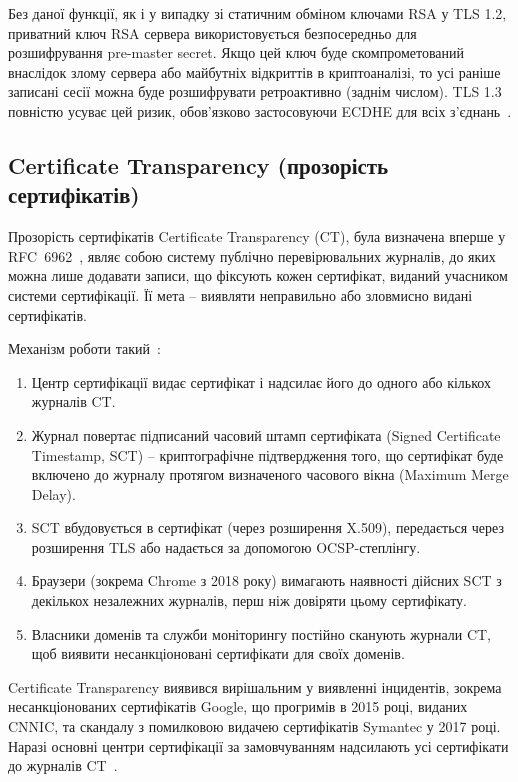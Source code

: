 Без даної функції, як і у випадку зі статичним обміном ключами RSA у TLS 1.2, приватний ключ RSA сервера використовується 
безпосередньо для розшифрування pre-master secret. Якщо цей ключ буде скомпрометований внаслідок злому сервера 
або майбутніх відкриттів в криптоаналізі, то усі раніше записані сесії можна буде розшифрувати ретроактивно 
(заднім числом). TLS 1.3 повністю усуває цей ризик, обов'язково застосовуючи ECDHE для всіх з'єднань~\cite{rfc8446}.

\subsection{Certificate Transparency (прозорість сертифікатів)}

Прозорість сертифікатів Certificate Transparency (CT), була визначена вперше у RFC~6962~\cite{rfc6962}, 
являє собою систему публічно перевірювальних журналів, до яких можна лише додавати записи, що фіксують кожен 
сертифікат, виданий учасником системи сертифікації. Її мета -- виявляти неправильно або зловмисно видані сертифікатів. 

\noindent Механізм роботи такий~\cite{google_ct_policy}:
\begin{enumerate}
    \item Центр сертифікації видає сертифікат і надсилає його до одного або кількох журналів CT.
    \item Журнал повертає підписаний часовий штамп сертифіката (Signed Certificate Timestamp, SCT) -- криптографічне 
        підтвердження того, що сертифікат буде включено до журналу протягом визначеного часового вікна (Maximum 
        Merge Delay).
    \item SCT вбудовується в сертифікат (через розширення X.509), передається через розширення TLS або надається
        за допомогою OCSP-степлінгу.
    \item  Браузери (зокрема Chrome з 2018 року) вимагають наявності дійсних SCT з декількох незалежних журналів,
        перш ніж довіряти цьому сертифікату.
    \item Власники доменів та служби моніторингу постійно сканують журнали CT, щоб виявити несанкціоновані
        сертифікати для своїх доменів.
\end{enumerate}

Certificate Transparency виявився вирішальним у виявленні інцидентів, зокрема несанкціонованих сертифікатів Google, 
що прогримів в 2015 році, виданих CNNIC, та скандалу з помилковою видачею сертифікатів Symantec у 2017 році. Наразі 
основні центри сертифікації за замовчуванням надсилають усі сертифікати до журналів CT~\cite{letsencrypt_ct}.

